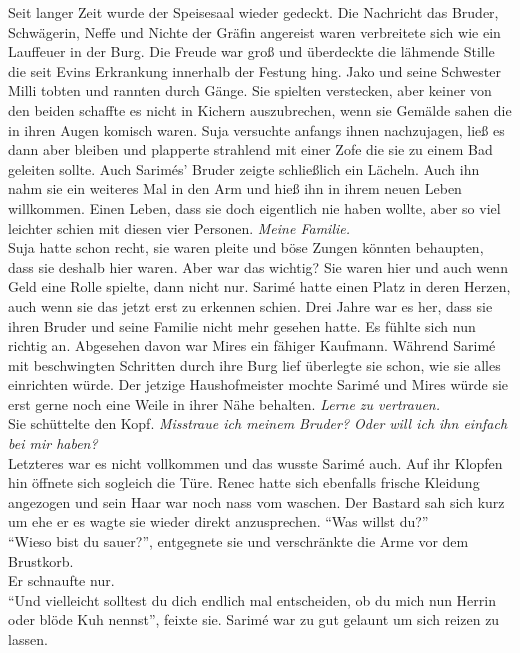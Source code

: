 Seit langer Zeit wurde der Speisesaal wieder gedeckt. Die Nachricht das Bruder, Schwägerin, Neffe 
und Nichte der Gräfin angereist waren verbreitete sich wie ein Lauffeuer in der Burg. Die Freude 
war 
groß und überdeckte die lähmende Stille die seit Evins Erkrankung innerhalb der Festung hing. Jako 
und seine Schwester Milli tobten und rannten durch Gänge. Sie spielten verstecken, aber keiner von 
den beiden schaffte es nicht in Kichern auszubrechen, wenn sie Gemälde sahen die in ihren Augen 
komisch waren. Suja versuchte anfangs ihnen nachzujagen, ließ es dann aber bleiben und plapperte 
strahlend mit einer Zofe die sie zu einem Bad geleiten sollte. Auch Sarimés' Bruder zeigte 
schließlich ein Lächeln. Auch ihn nahm sie ein weiteres Mal in den Arm und hieß ihn in ihrem neuen 
Leben willkommen. Einen Leben, dass sie doch eigentlich nie haben wollte, aber so viel leichter 
schien mit diesen vier Personen. \textit{Meine Familie.}\\
Suja hatte schon recht, sie waren pleite und böse Zungen könnten behaupten, dass sie deshalb hier 
waren. Aber war das wichtig? Sie waren hier und auch wenn Geld eine Rolle spielte, dann nicht nur. 
Sarimé hatte einen Platz in deren Herzen, auch wenn sie das jetzt erst zu erkennen schien. Drei 
Jahre war es her, dass sie ihren Bruder und seine Familie nicht mehr gesehen hatte. Es fühlte sich 
nun richtig an. Abgesehen davon war Mires ein fähiger Kaufmann. Während Sarimé mit beschwingten 
Schritten durch ihre Burg lief überlegte sie schon, wie sie alles einrichten würde. Der jetzige 
Haushofmeister mochte Sarimé und Mires würde sie erst gerne noch eine Weile in ihrer Nähe behalten.
\textit{Lerne zu vertrauen.}\\
Sie schüttelte den Kopf. \textit{Misstraue ich meinem Bruder? Oder will ich ihn einfach bei mir 
haben?}\\
Letzteres war es nicht vollkommen und das wusste Sarimé auch. Auf ihr Klopfen hin öffnete sich 
sogleich die Türe. Renec hatte sich ebenfalls frische Kleidung angezogen und sein Haar war noch 
nass vom waschen. Der Bastard sah sich kurz um ehe er es wagte sie wieder direkt anzusprechen. 
``Was willst du?''\\
``Wieso bist du sauer?'', entgegnete sie und verschränkte die Arme vor dem Brustkorb. \\
Er schnaufte nur.\\
``Und vielleicht solltest du dich endlich mal entscheiden, ob du mich nun Herrin oder blöde Kuh 
nennst'', feixte sie. Sarimé war zu gut gelaunt um sich reizen zu lassen. \\
